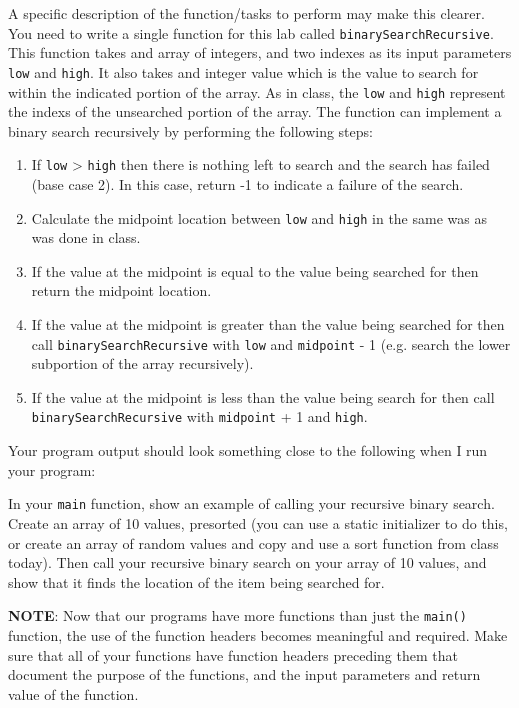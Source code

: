 \documentclass[11pt]{article}
\begin{document}
A specific description of the function/tasks to perform may make this
clearer.  You need to write a single function for this lab called
\verb~binarySearchRecursive~.  This function takes and array of integers,
and two indexes as its input parameters \verb~low~ and \verb~high~.  It also
takes and integer value which is the value to search for within the
indicated portion of the array.  As in class, the \verb~low~ and \verb~high~
represent the indexs of the unsearched portion of the array.  The
function can implement a binary search recursively by performing the
following steps:

\begin{enumerate}
\item If \verb~low~ > \verb~high~ then there is nothing left to search and the
   search has failed (base case 2).  In this case, return -1 to
   indicate a failure of the search.
\item Calculate the midpoint location between \verb~low~ and \verb~high~ in the
   same was as was done in class.
\item If the value at the midpoint is equal to the value being searched for
   then return the midpoint location.
\item If the value at the midpoint is greater than the value being searched for
   then call \verb~binarySearchRecursive~ with \verb~low~ and \verb~midpoint~ - 1 (e.g. 
   search the lower subportion of the array recursively).
\item If the value at the midpoint is less than the value being search for 
   then call \verb~binarySearchRecursive~ with \verb~midpoint~ + 1 and \verb~high~.
\end{enumerate}

Your program output should look something close to the following when I
run your program:


In your \verb~main~ function, show an example of calling your recursive
binary search.  Create an array of 10 values, presorted (you can use a
static initializer to do this, or create an array of random values and
copy and use a sort function from class today).  Then call your
recursive binary search on your array of 10 values, and show that it
finds the location of the item being searched for.

\textbf{NOTE}: Now that our programs have more functions than just the
\verb~main()~ function, the use of the function headers becomes meaningful
and required.  Make sure that all of your functions have function
headers preceding them that document the purpose of the functions, and
the input parameters and return value of the function.
\end{document}
